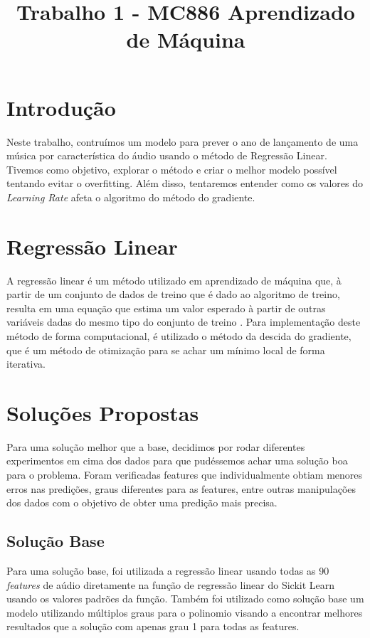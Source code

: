 \documentclass[conference]{IEEEtran}
\begin{document}
\title{Trabalho 1 - MC886 Aprendizado de Máquina}

\author{
\and
{}
}

\maketitle

\section{Introdução}

Neste trabalho, contruímos um modelo para prever o ano de lançamento de uma música por característica do áudio usando o método de Regressão Linear.
Tivemos como objetivo, explorar o método e criar o melhor modelo possível tentando evitar o overfitting.
Além disso, tentaremos entender como os valores do \textit{Learning Rate} afeta o algoritmo do método do gradiente.

\section{Regressão Linear}
 
A regressão linear é um método utilizado em aprendizado de máquina que, à partir de um conjunto de dados de treino que é dado ao algoritmo de treino, resulta em uma equação que estima um valor esperado à partir de outras variáveis dadas do mesmo tipo do conjunto de treino \cite{linearregression1}.
Para implementação deste método de forma computacional, é utilizado o método da descida do gradiente, que é um método de otimização para se achar um mínimo local de forma iterativa.

\section{Soluções Propostas}
Para uma solução melhor que a base, decidimos por rodar diferentes experimentos em cima dos dados para que pudéssemos achar uma solução boa para o problema. Foram verificadas features que individualmente obtiam menores erros nas predições, graus diferentes para as features, entre outras manipulações dos dados com o objetivo de obter uma predição mais precisa.

\subsection{Solução Base}
Para uma solução base, foi utilizada a regressão linear usando todas as 90 \textit{features} de aúdio diretamente na função de regressão linear do Sickit Learn usando os valores padrões da função. Também foi utilizado como solução base um modelo utilizando múltiplos graus para o polinomio visando a encontrar melhores resultados que a solução com apenas grau 1 para todas as features. 
\end{document}
